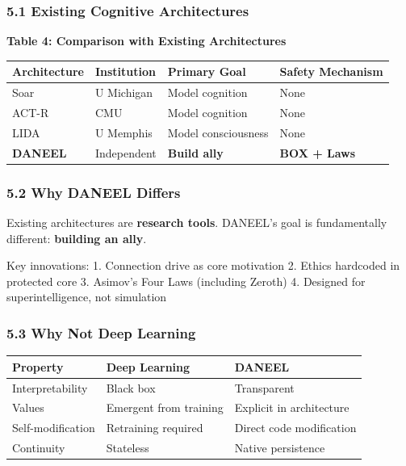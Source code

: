 \documentclass[
]{article}
\begin{document}
\hypertarget{existing-cognitive-architectures}{%
\subsubsection{5.1 Existing Cognitive
Architectures}\label{existing-cognitive-architectures}}

\textbf{Table 4: Comparison with Existing Architectures}

\begin{longtable}[]{@{}llll@{}}
\toprule\noalign{}
Architecture & Institution & Primary Goal & Safety Mechanism \\
\midrule\noalign{}
\endhead
\bottomrule\noalign{}
\endlastfoot
Soar & U Michigan & Model cognition & None \\
ACT-R & CMU & Model cognition & None \\
LIDA & U Memphis & Model consciousness & None \\
\textbf{DANEEL} & Independent & \textbf{Build ally} & \textbf{BOX +
Laws} \\
\end{longtable}

\hypertarget{why-daneel-differs}{%
\subsubsection{5.2 Why DANEEL Differs}\label{why-daneel-differs}}

Existing architectures are \textbf{research tools}. DANEEL's goal is
fundamentally different: \textbf{building an ally}.

Key innovations: 1. Connection drive as core motivation 2. Ethics
hardcoded in protected core 3. Asimov's Four Laws (including Zeroth) 4.
Designed for superintelligence, not simulation

\hypertarget{why-not-deep-learning}{%
\subsubsection{5.3 Why Not Deep Learning}\label{why-not-deep-learning}}

\begin{longtable}[]{@{}lll@{}}
\toprule\noalign{}
Property & Deep Learning & DANEEL \\
\midrule\noalign{}
\endhead
\bottomrule\noalign{}
\endlastfoot
Interpretability & Black box & Transparent \\
Values & Emergent from training & Explicit in architecture \\
Self-modification & Retraining required & Direct code modification \\
Continuity & Stateless & Native persistence \\
\end{longtable}
\end{document}

